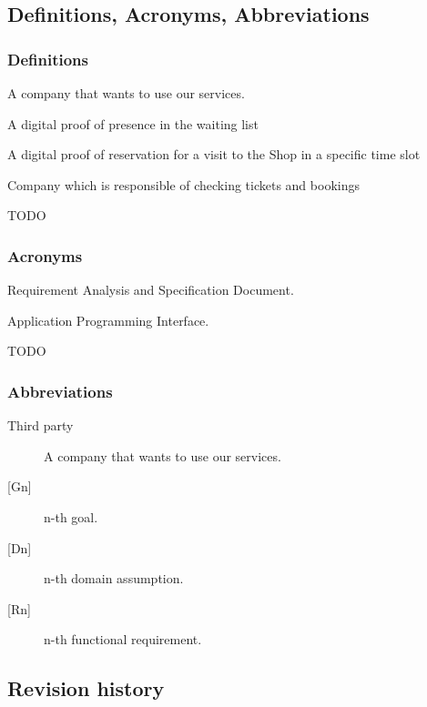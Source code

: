 \subsection{Definitions, Acronyms, Abbreviations}
\subsubsection{Definitions}
\begin{description}
    \item [Third party company] A company that wants to use our services.
    \item [Ticket] A digital proof of presence in the waiting list
    \item [Booking] A digital proof of reservation for a visit to the Shop in a specific time slot
    \item [Token] 
    \item [Staff] Company  which is responsible of checking tickets and bookings
    {\todo
        \item \huge TODO
    }
\end{description}
\subsubsection{Acronyms}
\begin{description}
    \item [RASD] Requirement Analysis and Specification Document. 
    \item [API] Application Programming Interface.
    {\todo
        \item \huge TODO
    }
\end{description}
\subsubsection{Abbreviations}
\begin{description}
    \item [Third party] A company that wants to use our services.
    \item [{[Gn]}] n-th goal. 
    \item [{[Dn]}] n-th domain assumption. 
    \item [{[Rn]}] n-th functional requirement. 
\end{description}

\subsection{Revision history}

